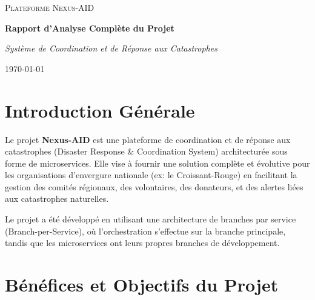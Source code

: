 \documentclass[12pt,a4paper]{report}
\begin{document}
\begin{titlepage}
    \centering
    \vspace*{2cm}
    
    {\scshape\LARGE Plateforme Nexus-AID \par}
    \vspace{1.5cm}
    {\huge\bfseries Rapport d'Analyse Complète du Projet\par}
    \vspace{2cm}
    {\Large\itshape Système de Coordination et de Réponse aux Catastrophes\par}
    \vspace{2cm}
    
    \vfill
    
    {\large \today\par}
\end{titlepage}

\tableofcontents
\newpage

\chapter{Introduction Générale}
Le projet \textbf{Nexus-AID} est une plateforme de coordination et de réponse aux catastrophes (Disaster Response \& Coordination System) architecturée sous forme de microservices. Elle vise à fournir une solution complète et évolutive pour les organisations d'envergure nationale (ex: le Croissant-Rouge) en facilitant la gestion des comités régionaux, des volontaires, des donateurs, et des alertes liées aux catastrophes naturelles.

Le projet a été développé en utilisant une architecture de branches par service (Branch-per-Service), où l'orchestration s'effectue sur la branche principale, tandis que les microservices ont leurs propres branches de développement.

\chapter{Bénéfices et Objectifs du Projet}
\end{document}
